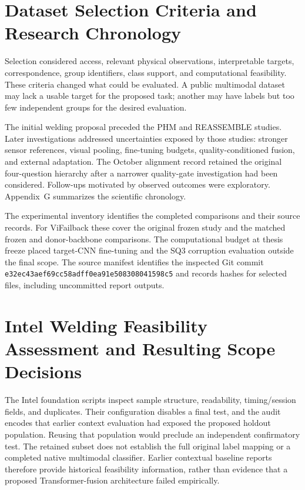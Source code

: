\section{Dataset Selection Criteria and Research Chronology}
Selection considered access, relevant physical observations, interpretable targets, correspondence, group identifiers, class support, and computational feasibility. These criteria changed what could be evaluated. A public multimodal dataset may lack a usable target for the proposed task; another may have labels but too few independent groups for the desired evaluation.

The initial welding proposal preceded the PHM and REASSEMBLE studies. Later investigations addressed uncertainties exposed by those studies: stronger sensor references, visual pooling, fine-tuning budgets, quality-conditioned fusion, and external adaptation. The October alignment record retained the original four-question hierarchy after a narrower quality-gate investigation had been considered. Follow-ups motivated by observed outcomes were exploratory. Appendix~G summarizes the scientific chronology.

The experimental inventory identifies the completed comparisons and their source records. For ViFailback these cover the original frozen study and the matched frozen and donor-backbone comparisons. The computational budget at thesis freeze placed target-CNN fine-tuning and the SQ3 corruption evaluation outside the final scope. The source manifest identifies the inspected Git commit \texttt{e32ec43aef69cc58adff0ea91e508308041598c5} and records hashes for selected files, including uncommitted report outputs.

\section{Intel Welding Feasibility Assessment and Resulting Scope Decisions}
The Intel foundation scripts inspect sample structure, readability, timing/session fields, and duplicates. Their configuration disables a final test, and the audit encodes that earlier context evaluation had exposed the proposed holdout population. Reusing that population would preclude an independent confirmatory test. The retained subset does not establish the full original label mapping or a completed native multimodal classifier. Earlier contextual baseline reports therefore provide historical feasibility information, rather than evidence that a proposed Transformer-fusion architecture failed empirically.

